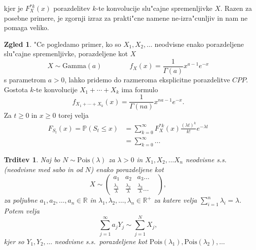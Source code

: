 \documentclass[12pt, a4paper, reqno]{amsart}
\theoremstyle{definition} %
\newtheorem{zgled}[definicija]{Zgled}
\theoremstyle{plain} %
\newtheorem{trditev}[definicija]{Trditev}
\newcommand{\R}{\mathbb{R}}
\newcommand{\Prob}{\mathbb{P}}
\newcommand{\1}{\mathds{1}}
\newcommand{\Pois}[1]{\text{Pois}(#1)}
\begin{document}
    \noindent
    kjer je $F_X^{*k}(x)$ porazdelitev $k$-te konvolucije slu"cajne spremenljivke $X$. Razen za 
    posebne primere, je zgornji izraz za prakti"cne namene ne-izra"cunljiv in nam ne pomaga veliko.
    
    \begin{zgled}
        "Ce pogledamo primer, ko so $X_1, X_2, \dots$ neodvisne enako porazdeljene slu"cajne spremenljivke,
        porazdeljene kot $X$
        \begin{equation*}
            X\sim\text{Gamma}(a) \qquad \qquad f_X(x) = \frac{1}{\Gamma(a)}x^{a-1}e^{-x}
        \end{equation*}
        s parametrom $a>0$, lahko pridemo do razmeroma eksplicitne porazdelitve $CPP$. Gostota $k$-te 
        konvolucije $X_1 + \cdots + X_k$ ima formulo
        \begin{equation*}
            f_{X_1 + \cdots + X_k}(x) = \frac{1}{\Gamma(na)}x^{na-1}e^{-x}.
        \end{equation*}
        Za $t\geq 0$ in $x \geq 0$ torej velja
        \begin{align*}
            F_{S_t}(x) = \Prob(S_t \leq x)
            &= \sum_{k=0}^\infty F_X^{*k}(x)\frac{(\lambda t)^k}{k!}e^{-\lambda t}\\
            &= \sum_{k=0}^\infty 
            ...
        \end{align*}

        

    \end{zgled}
    
    
    \begin{trditev}
        Naj bo $N\sim \Pois{\lambda}$  za $\lambda >0$ in $X_1, X_2, \dots X_n$ neodvisne s.s. (neodvisne 
        med sabo in od $N$) enako porazdeljene kot
        $$ X\sim
        \begin{pmatrix}
            a_1 & a_2 & a_3  \dots & \\
            \tfrac{\lambda_1}{\lambda} & \tfrac{\lambda_2}{\lambda} & \tfrac{\lambda_3}{\lambda} \dots & 
        \end{pmatrix},
        $$
        za poljubne $a_1, a_2, \dots, a_n \in \R$ in 
        $\lambda_1, \lambda_2, \dots, \lambda_n \in \R^+$ za katere velja 
        ${\sum_{i=1}^n\lambda_i = \lambda}$.
        Potem velja 
        \begin{equation*}
            \sum_{j=1}^\infty a_jY_j \sim \sum_{j=1}^NX_j,
        \end{equation*}
        kjer so $Y_1,Y_2,  \dots$ neodvisne s.s.\ porazdeljene kot 
        $\Pois{\lambda_1},\Pois{\lambda_2}, \dots$
        \label{trd:NXjeEnakoaY}
    \end{trditev}
\end{document}
